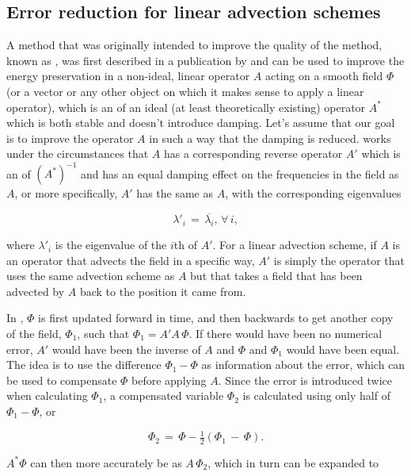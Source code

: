 \subsection{Error reduction for linear advection schemes}

A method that was originally intended to improve the quality of the \LS method, known as \BFECC, was first described in a publication by \citet{Dupont2003} and can be used to improve the energy preservation in a non-ideal, linear operator $A$ acting on a smooth field $\Phi$ (or a vector or any other object on which it makes sense to apply a linear operator), which is an \approximation of an ideal (at least theoretically existing) operator $A^*$ which is both stable and doesn't introduce damping. Let's assume that our goal is to improve the operator $A$ in such a way that the damping is reduced. \BFECC works under the circumstances that $A$ has a corresponding reverse operator $A'$ which is an \approximation of $(A^*)^{-1}$ and has an equal damping effect on the frequencies in the field as $A$, or more specifically, $A'$ has the same \eigenfunctions as $A$, with the corresponding eigenvalues

\begin{equation}
\lambda'_i \,=\, \overline{\lambda_i}, \,\forall\,i,
\end{equation}

where $\lambda'_i$ is the eigenvalue of the $i$th \eigenfunction of $A'$. For a linear advection scheme, if $A$ is an operator that advects the field in a specific way, $A'$ is simply the operator that uses the same advection scheme as $A$ but that takes a field that has been advected by $A$ back to the position it came from.

In \BFECC, $\Phi$ is first updated forward in time, and then backwards to get another copy of the field, $\Phi_1$, such that $\Phi_1 = A'A\,\Phi$. If there would have been no numerical error, $A'$ would have been the inverse of $A$ and $\Phi$ and $\Phi_1$ would have been equal. The idea is to use the difference $\Phi_1-\Phi$ as information about the error, which can be used to compensate $\Phi$ before applying $A$. Since the error is introduced twice when calculating $\Phi_1$, a compensated variable $\Phi_2$ is calculated using only half of $\Phi_1-\Phi$, or

\begin{equation}
\Phi_2 \,=\, \Phi - \tfrac{1}{2}(\Phi_1 \,-\, \Phi).
\end{equation}

$A^*\Phi$ can then more accurately be \approximated as $A\,\Phi_2$, which in turn can be expanded to

